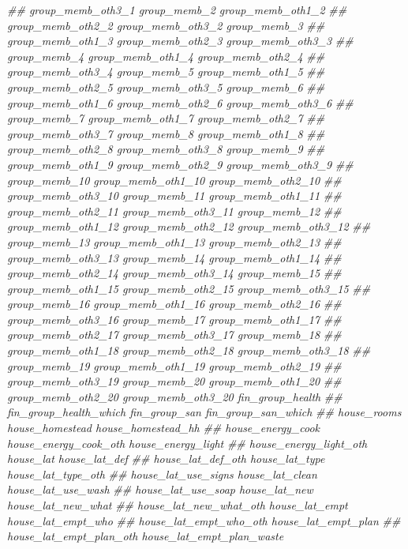 \documentclass[
]{article}
\newenvironment{Shaded}{\begin{snugshade}}{\end{snugshade}}
\newcommand{\CommentTok}[1]{\textcolor[rgb]{0.56,0.35,0.01}{\textit{#1}}}
\begin{document}
\begin{Shaded}
\begin{Highlighting}[]
\CommentTok{##      group_memb_oth3_1 group_memb_2 group_memb_oth1_2}
\CommentTok{##      group_memb_oth2_2 group_memb_oth3_2 group_memb_3}
\CommentTok{##      group_memb_oth1_3 group_memb_oth2_3 group_memb_oth3_3}
\CommentTok{##      group_memb_4 group_memb_oth1_4 group_memb_oth2_4}
\CommentTok{##      group_memb_oth3_4 group_memb_5 group_memb_oth1_5}
\CommentTok{##      group_memb_oth2_5 group_memb_oth3_5 group_memb_6}
\CommentTok{##      group_memb_oth1_6 group_memb_oth2_6 group_memb_oth3_6}
\CommentTok{##      group_memb_7 group_memb_oth1_7 group_memb_oth2_7}
\CommentTok{##      group_memb_oth3_7 group_memb_8 group_memb_oth1_8}
\CommentTok{##      group_memb_oth2_8 group_memb_oth3_8 group_memb_9}
\CommentTok{##      group_memb_oth1_9 group_memb_oth2_9 group_memb_oth3_9}
\CommentTok{##      group_memb_10 group_memb_oth1_10 group_memb_oth2_10}
\CommentTok{##      group_memb_oth3_10 group_memb_11 group_memb_oth1_11}
\CommentTok{##      group_memb_oth2_11 group_memb_oth3_11 group_memb_12}
\CommentTok{##      group_memb_oth1_12 group_memb_oth2_12 group_memb_oth3_12}
\CommentTok{##      group_memb_13 group_memb_oth1_13 group_memb_oth2_13}
\CommentTok{##      group_memb_oth3_13 group_memb_14 group_memb_oth1_14}
\CommentTok{##      group_memb_oth2_14 group_memb_oth3_14 group_memb_15}
\CommentTok{##      group_memb_oth1_15 group_memb_oth2_15 group_memb_oth3_15}
\CommentTok{##      group_memb_16 group_memb_oth1_16 group_memb_oth2_16}
\CommentTok{##      group_memb_oth3_16 group_memb_17 group_memb_oth1_17}
\CommentTok{##      group_memb_oth2_17 group_memb_oth3_17 group_memb_18}
\CommentTok{##      group_memb_oth1_18 group_memb_oth2_18 group_memb_oth3_18}
\CommentTok{##      group_memb_19 group_memb_oth1_19 group_memb_oth2_19}
\CommentTok{##      group_memb_oth3_19 group_memb_20 group_memb_oth1_20}
\CommentTok{##      group_memb_oth2_20 group_memb_oth3_20 fin_group_health}
\CommentTok{##      fin_group_health_which fin_group_san fin_group_san_which}
\CommentTok{##      house_rooms house_homestead house_homestead_hh}
\CommentTok{##      house_energy_cook house_energy_cook_oth house_energy_light}
\CommentTok{##      house_energy_light_oth house_lat house_lat_def}
\CommentTok{##      house_lat_def_oth house_lat_type house_lat_type_oth}
\CommentTok{##      house_lat_use_signs house_lat_clean house_lat_use_wash}
\CommentTok{##      house_lat_use_soap house_lat_new house_lat_new_what}
\CommentTok{##      house_lat_new_what_oth house_lat_empt house_lat_empt_who}
\CommentTok{##      house_lat_empt_who_oth house_lat_empt_plan}
\CommentTok{##      house_lat_empt_plan_oth house_lat_empt_plan_waste}

\end{Highlighting}
\end{Shaded}
\end{document}
